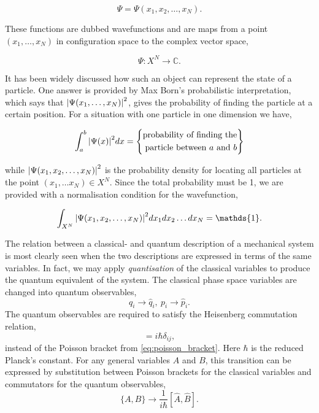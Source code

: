     \begin{equation}
        \Psi = \Psi(x_1, x_2, \dots, x_N).
    \end{equation}
    
    These functions
    are dubbed wavefunctions and are maps from a point $(x_1, \dots, x_N)$ in
    configuration space to the complex vector space,

    \begin{equation}
        \Psi: X^N \to \mathds{C}.
    \end{equation}

    It has been widely discussed how such an object can represent the state of a 
    particle. One answer is provided by Max Born's probabilistic interpretation,
    which says that $\abs{\Psi(x_1, \dots, x_N)}^2$, gives the probability of finding
    the particle at a certain position. For a situation with one particle in one
    dimension we have,

    \begin{equation}
        \int_a^b \abs{\Psi(x)}^2 dx = 
        \left\{\begin{aligned}
            \text{probability of finding the} \\
            \text{particle between $a$ and $b$}
        \end{aligned}\right\}
    \end{equation}

    while $\abs{\Psi(x_1, x_2, \dots, x_N)}^2$ is the probability density for locating
    all particles at the point $(x_1, \dots x_N) \in X^N$. Since the total probability
    must be 1, we are provided with a normalisation condition for the wavefunction,
    
    \begin{equation}
        \int_{X^N} \abs{\Psi(x_1, x_2, \dots, x_N)}^2 dx_1 dx_2\dots dx_N = \mathds{1}.
    \end{equation}

    The relation between a classical- and quantum description of a mechanical system 
    is most clearly seen when the two descriptions are expressed in terms of the same 
    variables. In fact, we may apply \emph{quantisation} of the classical variables to 
    produce the quantum equivalent of the system. The classical phase space variables 
    are changed into quantum observables,
    \begin{equation}
        q_i \to \hat{q}_i, \ p_i \to \hat{p}_i.
    \end{equation}
    The quantum observables are required to satisfy the Heisenberg commutation relation,
    \begin{equation}
        [\hat{q}_i, \hat{p}_j] = i \hbar \delta_{ij},
    \end{equation}
    instead of the Poisson bracket from \autoref{eq:poisson_bracket}. Here $\hbar$ is the 
    reduced Planck's constant. For any general variables $A$ and $B$, this 
    transition can be expressed by substitution between Poisson brackets for the 
    classical variables and commutators for the quantum observables,
    \begin{equation}
        \{A, B\} \to \frac{1}{i\hbar}[\hat{A},\hat{B}].
    \end{equation}


